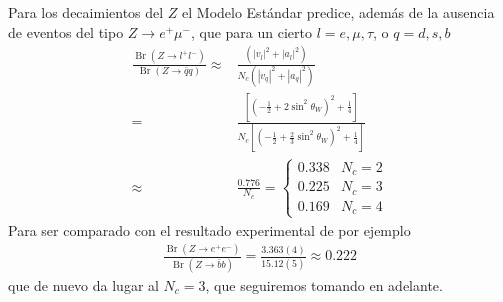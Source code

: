 \begin{frame}
Para los decaimientos del $Z$ el Modelo Estándar predice, además de la ausencia de eventos del tipo $Z\to e^+\mu^-$, que para un cierto  $l=e,\mu,\tau$, o  $q=d,s,b$
\begin{align}
  \frac{ \operatorname{Br}(Z\to l^+l^-)}{ \operatorname{Br}(Z\to\bar{q}q)}\approx&
\frac{(|v_l|^2+|a_l|^2)}{N_c(|v_q|^2+|a_q|^2)}\nonumber\\
=&\frac{\left[\left(-\frac{1}{2}+2\sin^2\theta_W\right)^2+\frac{1}{4}\right]}{
N_c\left[\left(-\frac{1}{2}+\frac{2}{3}\sin^2\theta_W\right)^2+\frac{1}{4}\right]}\nonumber\\
\approx&\frac{0.776}{N_c}=
\begin{cases}
  0.338& N_c=2\\
  0.225& N_c=3\\
  0.169& N_c=4
\end{cases}
\end{align}
Para ser comparado con el resultado experimental de por ejemplo
\begin{align}
  \frac{ \operatorname{Br}(Z\to e^+e^-)}{ \operatorname{Br}(Z\to\bar{b}b)}=\frac{3.363(4)}{15.12(5)}\approx0.222
\end{align}
que de nuevo da lugar al $N_c=3$, que seguiremos tomando en adelante.


\end{frame}
